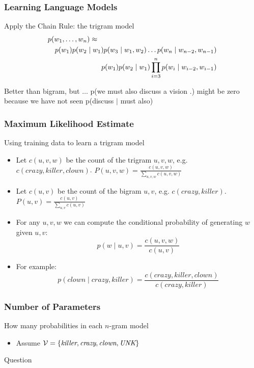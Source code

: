 \begin{frame}
\frametitle{Learning Language Models}
\begin{block}{Apply the Chain Rule: the trigram model}
\begin{eqnarray*}
\lefteqn{p(w_1, \ldots, w_n) \approx} \\
&& p(w_1) p(w_2 \mid w_1) p(w_3 \mid w_1, w_2) \ldots p(w_n \mid w_{n-2}, w_{n-1}) \\
&& p(w_1) p(w_2 \mid w_1) \prod_{i=3}^n p(w_i \mid w_{i-2}, w_{i-1})
\end{eqnarray*}
\end{block}
\pause
\begin{block}{Better than bigram, but $\ldots$}
p(\textsf{we must also discuss a vision .}) might be zero because we have not seen p(discuss $\mid$ must also)
\end{block}
\end{frame}

\begin{frame}
\frametitle{Maximum Likelihood Estimate}
\begin{block}{Using training data to learn a trigram model}
\begin{itemize}[<+->]
\item Let $c(u,v,w)$ be the count of the trigram $u,v,w$, e.g. $c(crazy,killer,clown)$. $P(u,v,w) = \frac{c(u,v,w)}{\sum_{u,v,w} c(u,v,w)}$
\item Let $c(u,v)$ be the count of the bigram $u,v$, e.g. $c(crazy,killer)$. $P(u,v) = \frac{c(u,v)}{\sum_{u,v} c(u,v)}$
\item For any $u,v,w$ we can compute the conditional probability of generating $w$ given $u,v$:
\[ p(w \mid u,v) = \frac{c(u,v,w)}{c(u,v)} \]
\item For example:
\[ p(clown \mid crazy, killer) = \frac{c(crazy, killer, clown)}{c(crazy, killer)} \]
\end{itemize}

\end{block}
\end{frame}

\begin{frame}
\frametitle{Number of Parameters}
\begin{block}{How many probabilities in each $n$-gram model}
\begin{itemize}
\item Assume ${\cal V} = \{ \textit{killer}, \textit{crazy}, \textit{clown}, \textit{UNK} \}$
\end{itemize}
\end{block}
\pause
\begin{alertblock}{Question}
\end{alertblock}
\end{frame}

